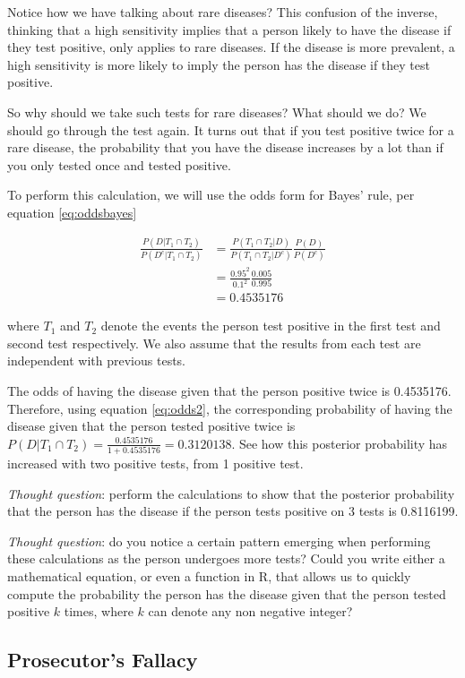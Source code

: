\documentclass[
]{book}
\begin{document}
Notice how we have talking about rare diseases? This confusion of the inverse, thinking that a high sensitivity implies that a person likely to have the disease if they test positive, only applies to rare diseases. If the disease is more prevalent, a high sensitivity is more likely to imply the person has the disease if they test positive.

So why should we take such tests for rare diseases? What should we do? We should go through the test again. It turns out that if you test positive twice for a rare disease, the probability that you have the disease increases by a lot than if you only tested once and tested positive.

To perform this calculation, we will use the odds form for Bayes' rule, per equation \eqref{eq:oddsbayes}

\[
\begin{split}
\frac{P(D|T_1 \cap T_2)}{P(D^c|T_1 \cap T_2)} &= \frac{P(T_1 \cap T_2 | D)}{P(T_1 \cap T_2 | D^c)} \frac{P(D)}{P(D^c)}\\
 &= \frac{0.95^2}{0.1^2} \frac{0.005}{0.995} \\
&= 0.4535176
\end{split}
\]

where \(T_1\) and \(T_2\) denote the events the person test positive in the first test and second test respectively. We also assume that the results from each test are independent with previous tests.

The odds of having the disease given that the person positive twice is 0.4535176. Therefore, using equation \eqref{eq:odds2}, the corresponding probability of having the disease given that the person tested positive twice is \(P(D|T_1 \cap T_2) = \frac{0.4535176}{1+0.4535176} = 0.3120138\). See how this posterior probability has increased with two positive tests, from 1 positive test.

\emph{Thought question}: perform the calculations to show that the posterior probability that the person has the disease if the person tests positive on 3 tests is 0.8116199.

\emph{Thought question}: do you notice a certain pattern emerging when performing these calculations as the person undergoes more tests? Could you write either a mathematical equation, or even a function in R, that allows us to quickly compute the probability the person has the disease given that the person tested positive \(k\) times, where \(k\) can denote any non negative integer?

\hypertarget{prosecutors-fallacy}{%
\subsection{Prosecutor's Fallacy}\label{prosecutors-fallacy}}
\end{document}
